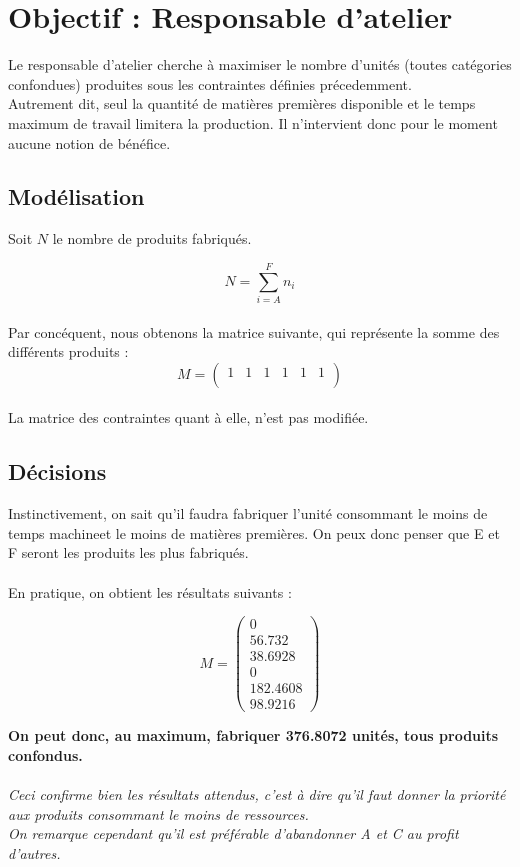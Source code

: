 \newpage
\section{Objectif : Responsable d'atelier}
Le responsable d'atelier cherche à maximiser le nombre d'unités (toutes
catégories confondues) produites sous les contraintes définies précedemment.\\
Autrement dit, seul la quantité de matières premières disponible et le temps
maximum de travail limitera la production. Il n'intervient donc pour le moment
aucune notion de bénéfice.

\subsection{Modélisation}
Soit $N$ le nombre de produits fabriqués.

\begin{equation}
	N = \sum_{i = A}^{F} n_i
\end{equation} 
~\\
Par concéquent, nous obtenons la matrice suivante, qui représente la somme des
différents produits :  
\begin{displaymath}
M = \left(
\begin{array}{cccccc}
1 & 1 & 1 & 1 & 1 & 1\\
\end{array}
\right)
\end{displaymath}
~\\
La matrice des contraintes quant à elle, n'est pas modifiée.

\subsection{Décisions}
Instinctivement, on sait qu'il faudra fabriquer l'unité consommant le moins de
\og temps machine\fg et le moins de matières premières. On peux donc penser que
E et F seront les produits les plus fabriqués.\\
~\\
En pratique, on obtient les résultats suivants :\\

\begin{displaymath}
M = \left(
\begin{array}{c}
0\\
56.732\\
38.6928\\
0\\
182.4608\\
98.9216 
\end{array}
\right)
\end{displaymath}
\begin{center}
\textbf{On peut donc, au maximum, fabriquer 376.8072 unités, tous produits
confondus.}\\
~\\
\textsl{Ceci confirme bien les résultats attendus, c'est à dire
qu'il faut donner la priorité aux produits consommant le moins de ressources.\\
On remarque cependant qu'il est préférable d'abandonner \textsl{A} et \textsl{C}
au profit d'autres.}
\end{center}

